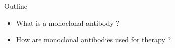 \begin{frame}{Outline}
    
    \begin{itemize}
        \item What is a monoclonal antibody ?
        \item How are monoclonal antibodies used for therapy ?
    \end{itemize}

\end{frame}